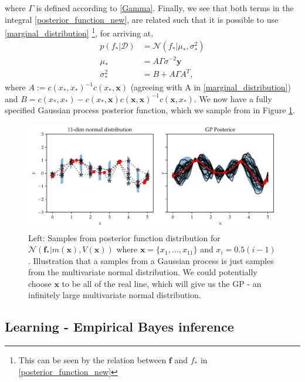 where $\Gamma$ is defined according to \eqref{Gamma}. Finally, we see that both terms in the
integral \eqref{posterior_function_new}, are related such that it is possible to use
\eqref{marginal_distribution} \footnote{This can be seen by the relation between $\textbf{f}$ and
$f_*$ in \eqref{posterior_function_new}}, for arriving at, 
\begin{align*}
    p(f_*|\mathcal{D}) &= \mathcal{N}(f_*|\mu_*,\sigma_*^2 )\\
    \mu_* &=  A\Gamma\sigma^{-2}\textbf{y}\\
    \sigma_*^2 &=  B+A\Gamma A^T,
\end{align*}
where $A :=  c(x_*,x_*)^{-1} c(x_*, \textbf{x})$ (agreeing with A in \eqref{marginal_distribution})
and $B = c(x_*, x_*)-c(x_*, \textbf{x})c(\textbf{x}, \textbf{x})^{-1}c(\textbf{x},x_*)$. We now have
a fully specified Gaussian process posterior function, which we sample from in Figure
\ref{GP_illustration2}. 


\begin{figure}[h]
    \centering
    \includegraphics[width = \textwidth]{Pictures/GP2_samples_mattern.pdf}
    \caption{Left: Samples from posterior function distribution for
    $\mathcal{N}(\textbf{f}_*|m(\textbf{x}),V(\textbf{x}))$ where $\textbf{x} = \{x_1,\dots, x_{11}\}$
    and $x_i= 0.5(i-1)$. Illustration that a samples from a Gaussian process is just samples from
    the multivariate normal distribution. We could potentially choose $\textbf{x}$ to be all of the
    real line, which will give us the GP - an infinitely large multivariate normal distribution.}
    \label{GP_illustration2}
\end{figure}





\subsection{Learning - Empirical Bayes inference}


